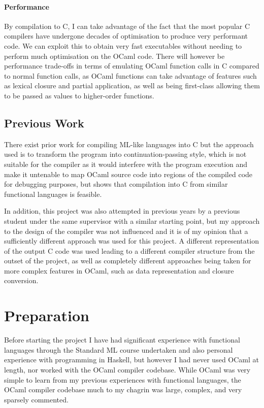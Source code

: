 \documentclass[12pt,a4paper,twoside,openright]{report}
\begin{document}
\subsubsection{Performance}

By compilation to C, I can take advantage of the fact that the most popular C 
compilers have undergone decades of optimisation to produce very performant 
code. We can exploit this to obtain very fast executables without needing to 
perform much optimisation on the OCaml code. There will however be performance 
trade-offs in terms of emulating OCaml function calls in C compared to normal 
function calls, as OCaml functions can take advantage of features such as
lexical closure and partial application, as well as being first-class allowing
them to be passed as values to higher-order functions.

\section{Previous Work}

There exist prior work for compiling ML-like languages into C
\cite{noassemblyrequired} but the approach used is to transform the program into
continuation-passing style, which is not suitable for the compiler as it would
interfere with the program execution and make it untenable to map OCaml source
code into regions of the compiled code for debugging purposes, but shows that
compilation into C from similar functional languages is feasible.

In addition, this project was also attempted in previous years by a previous
student \cite{previousproject} under the same supervisor with a similar starting
point, but my approach to the design of the compiler was not influenced and it
is of my opinion that a sufficiently different approach was used for this
project. A different representation of the output C code was used leading to a
different compiler structure from the outset of the project, as well as
completely different approaches being taken for more complex features in OCaml,
such as data representation and closure conversion.

\chapter{Preparation}

Before starting the project I have had significant experience with functional
languages through the Standard ML course undertaken and also personal experience
with programming in Haskell, but however I had never used OCaml at length, nor
worked with the OCaml compiler codebase. While OCaml was very simple to learn
from my previous experiences with functional languages, the OCaml compiler
codebase much to my chagrin was large, complex, and very sparsely commented.
\end{document}
